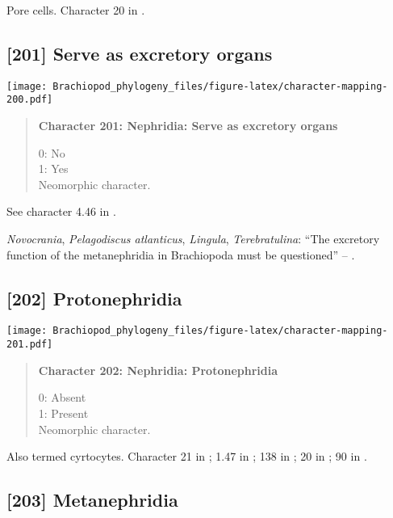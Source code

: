 \documentclass[openany]{book}
\theoremstyle{definition}
\theoremstyle{definition}
\theoremstyle{definition}
\theoremstyle{remark}
\begin{document}
Pore cells. Character 20 in \citet{Haszprunar2000}.

\subsection*{{[}201{]} Serve as excretory
organs}\label{serve-as-excretory-organs}

\texttt{[image: Brachiopod\_phylogeny\_files/figure-latex/character-mapping-200.pdf]}

\begin{quote}
\textbf{Character 201: Nephridia: Serve as excretory organs}

0: No\\
1: Yes\\
Neomorphic character.
\end{quote}

See character 4.46 in \citet{SPS1996}.

\hypertarget{Lingula-coding-201}{}
\emph{Novocrania}, \emph{Pelagodiscus atlanticus}, \emph{Lingula},
\emph{Terebratulina}: ``The excretory function of the metanephridia in
Brachiopoda must be questioned'' -- \citet{Luter1995}.

\subsection*{{[}202{]} Protonephridia}\label{protonephridia}

\texttt{[image: Brachiopod\_phylogeny\_files/figure-latex/character-mapping-201.pdf]}

\begin{quote}
\textbf{Character 202: Nephridia: Protonephridia}

0: Absent\\
1: Present\\
Neomorphic character.
\end{quote}

Also termed cyrtocytes. Character 21 in \citet{Grobe2007}; 1.47 in
\citet{SPS1996}; 138 in \citet{Rouse1999}; 20 in \citet{Haszprunar1996};
90 in \citet{Glenner2004}.

\subsection*{{[}203{]} Metanephridia}\label{metanephridia}
\end{document}
